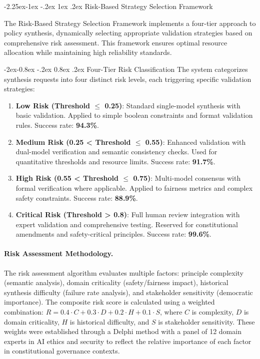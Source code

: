 \documentclass[manuscript,screen,9pt]{acmart}
\makeatletter
\renewcommand\subsection{\@startsection{subsection}{2}{\z@}%
  {-2.25ex\@plus -1ex \@minus -.2ex}%
  {1ex \@plus .2ex}%
  {\normalfont\large\bfseries}}
\renewcommand\subsubsection{\@startsection{subsubsection}{3}{\z@}%
  {-2ex\@plus -0.8ex \@minus -.2ex}%
  {0.8ex \@plus .2ex}%
  {\normalfont\normalsize\bfseries}}
\makeatother
\begin{document}
\subsection{Risk-Based Strategy Selection Framework}
\label{subsec:risk_based_strategy}

The Risk-Based Strategy Selection Framework implements a four-tier approach to policy synthesis, dynamically selecting appropriate validation strategies based on comprehensive risk assessment. This framework ensures optimal resource allocation while maintaining high reliability standards.

\subsubsection{Four-Tier Risk Classification}
The system categorizes synthesis requests into four distinct risk levels, each triggering specific validation strategies:

\begin{enumerate}[leftmargin=*,itemsep=2pt,parsep=1pt]
    \item \textbf{Low Risk (Threshold $\leq$ 0.25)}: Standard single-model synthesis with basic validation. Applied to simple boolean constraints and format validation rules. Success rate: \textbf{94.3\%}.

    \item \textbf{Medium Risk (0.25 < Threshold $\leq$ 0.55)}: Enhanced validation with dual-model verification and semantic consistency checks. Used for quantitative thresholds and resource limits. Success rate: \textbf{91.7\%}.

    \item \textbf{High Risk (0.55 < Threshold $\leq$ 0.75)}: Multi-model consensus with formal verification where applicable. Applied to fairness metrics and complex safety constraints. Success rate: \textbf{88.9\%}.

    \item \textbf{Critical Risk (Threshold > 0.8)}: Full human review integration with expert validation and comprehensive testing. Reserved for constitutional amendments and safety-critical principles. Success rate: \textbf{99.6\%}.
\end{enumerate}

\paragraph{Risk Assessment Methodology.} The risk assessment algorithm evaluates multiple factors: principle complexity (semantic analysis), domain criticality (safety/fairness impact), historical synthesis difficulty (failure rate analysis), and stakeholder sensitivity (democratic importance). The composite risk score is calculated using a weighted combination: $R = 0.4 \cdot C + 0.3 \cdot D + 0.2 \cdot H + 0.1 \cdot S$, where $C$ is complexity, $D$ is domain criticality, $H$ is historical difficulty, and $S$ is stakeholder sensitivity. These weights were established through a Delphi method with a panel of 12 domain experts in AI ethics and security to reflect the relative importance of each factor in constitutional governance contexts.
\end{document}
